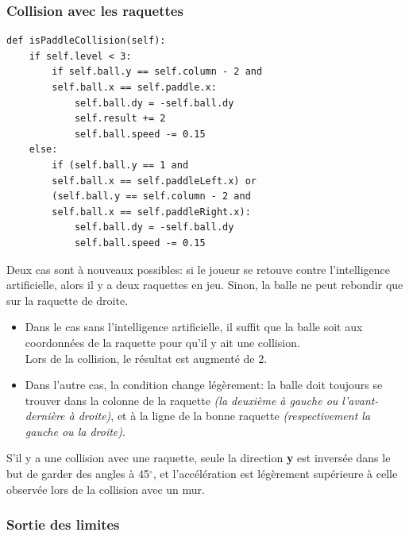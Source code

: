 \newpage

\subsubsection{Collision avec les raquettes}
\label{sec:collision-raquettes}

\begin{verbatim}
def isPaddleCollision(self):
    if self.level < 3:
        if self.ball.y == self.column - 2 and
        self.ball.x == self.paddle.x:
            self.ball.dy = -self.ball.dy
            self.result += 2
            self.ball.speed -= 0.15
    else:
        if (self.ball.y == 1 and
        self.ball.x == self.paddleLeft.x) or
        (self.ball.y == self.column - 2 and
        self.ball.x == self.paddleRight.x):
            self.ball.dy = -self.ball.dy
            self.ball.speed -= 0.15
\end{verbatim}

Deux cas sont à nouveaux possibles: si le joueur se retouve contre
l'intelligence artificielle, alors il y a deux raquettes en jeu. Sinon, la balle
ne peut rebondir que sur la raquette de droite.

\begin{itemize}

    \item Dans le cas sans l'intelligence artificielle, il suffit que la balle
    soit aux coordonnées de la raquette pour qu'il y ait une collision. \\
    Lors de la collision, le résultat est augmenté de 2.

    \item Dans l'autre cas, la condition change légèrement: la balle doit
    toujours se trouver dans la colonne de la raquette \textit{(la deuxième à
    gauche ou l'avant-dernière à droite)}, et à la ligne de la bonne raquette
    \textit{(respectivement la gauche ou la droite)}.

\end{itemize}

S'il y a une collision avec une raquette, seule la direction \textbf{y} est
inversée dans le but de garder des angles à 45$^{\circ}$, et l'accélération est
légèrement supérieure à celle observée lors de la collision avec un mur.

\newpage

\subsubsection{Sortie des limites}
\label{sec:sorties-limites}

